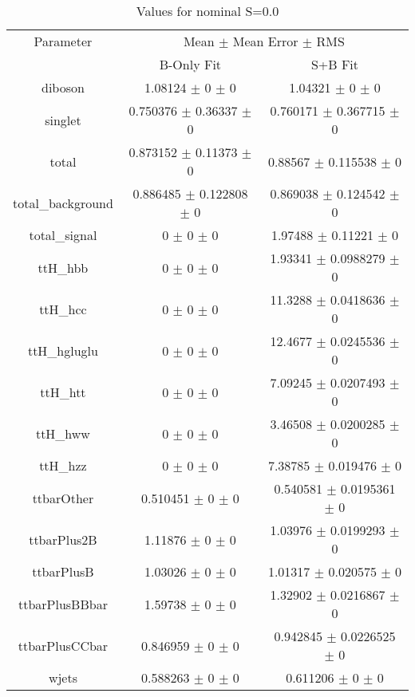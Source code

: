 \begin{table}
\centering
\caption{Values for nominal S=0.0}
\begin{tabular}{ccc}
\toprule
Parameter & \multicolumn{2}{c}{Mean $\pm$ Mean Error $\pm$ RMS}\\
 & B-Only Fit & S+B Fit\\
\midrule
diboson & \num{1.08124} $\pm$ \num{0} $\pm$ \num{0} & \num{1.04321} $\pm$ \num{0} $\pm$ \num{0}\\
singlet & \num{0.750376} $\pm$ \num{0.36337} $\pm$ \num{0} & \num{0.760171} $\pm$ \num{0.367715} $\pm$ \num{0}\\
total & \num{0.873152} $\pm$ \num{0.11373} $\pm$ \num{0} & \num{0.88567} $\pm$ \num{0.115538} $\pm$ \num{0}\\
total\_background & \num{0.886485} $\pm$ \num{0.122808} $\pm$ \num{0} & \num{0.869038} $\pm$ \num{0.124542} $\pm$ \num{0}\\
total\_signal & \num{0} $\pm$ \num{0} $\pm$ \num{0} & \num{1.97488} $\pm$ \num{0.11221} $\pm$ \num{0}\\
ttH\_hbb & \num{0} $\pm$ \num{0} $\pm$ \num{0} & \num{1.93341} $\pm$ \num{0.0988279} $\pm$ \num{0}\\
ttH\_hcc & \num{0} $\pm$ \num{0} $\pm$ \num{0} & \num{11.3288} $\pm$ \num{0.0418636} $\pm$ \num{0}\\
ttH\_hgluglu & \num{0} $\pm$ \num{0} $\pm$ \num{0} & \num{12.4677} $\pm$ \num{0.0245536} $\pm$ \num{0}\\
ttH\_htt & \num{0} $\pm$ \num{0} $\pm$ \num{0} & \num{7.09245} $\pm$ \num{0.0207493} $\pm$ \num{0}\\
ttH\_hww & \num{0} $\pm$ \num{0} $\pm$ \num{0} & \num{3.46508} $\pm$ \num{0.0200285} $\pm$ \num{0}\\
ttH\_hzz & \num{0} $\pm$ \num{0} $\pm$ \num{0} & \num{7.38785} $\pm$ \num{0.019476} $\pm$ \num{0}\\
ttbarOther & \num{0.510451} $\pm$ \num{0} $\pm$ \num{0} & \num{0.540581} $\pm$ \num{0.0195361} $\pm$ \num{0}\\
ttbarPlus2B & \num{1.11876} $\pm$ \num{0} $\pm$ \num{0} & \num{1.03976} $\pm$ \num{0.0199293} $\pm$ \num{0}\\
ttbarPlusB & \num{1.03026} $\pm$ \num{0} $\pm$ \num{0} & \num{1.01317} $\pm$ \num{0.020575} $\pm$ \num{0}\\
ttbarPlusBBbar & \num{1.59738} $\pm$ \num{0} $\pm$ \num{0} & \num{1.32902} $\pm$ \num{0.0216867} $\pm$ \num{0}\\
ttbarPlusCCbar & \num{0.846959} $\pm$ \num{0} $\pm$ \num{0} & \num{0.942845} $\pm$ \num{0.0226525} $\pm$ \num{0}\\
wjets & \num{0.588263} $\pm$ \num{0} $\pm$ \num{0} & \num{0.611206} $\pm$ \num{0} $\pm$ \num{0}\\
\bottomrule
\end{tabular}
\end{table}